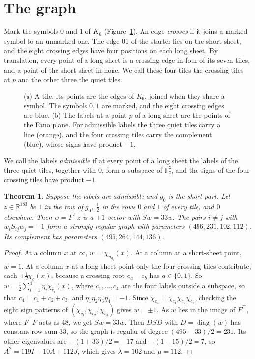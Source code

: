 \documentclass[11pt]{amsart}
\newtheorem{theorem}{Theorem}[section]
\theoremstyle{remark}
\newcommand{\F}{\mathbb{F}}
\newcommand{\R}{\mathbb{R}}
\begin{document}
\section{The graph}\label{sec:graph}

Mark the symbols $0$ and $1$ of $K_6$ (Figure~\ref{fig:tile}). An edge \emph{crosses} if it joins a marked symbol to an unmarked one. The edge $01$ of the starter lies on the short sheet, and the eight crossing edges have four positions on each long sheet. By translation, every point of a long sheet is a crossing edge in four of its seven tiles, and a point of the short sheet in none. We call these four tiles the crossing tiles at $p$ and the other three the quiet tiles.

\begin{figure}[t]
\centering

\caption{(a) A tile. Its points are the edges of $K_6$, joined when they share a symbol. The symbols $0,1$ are marked, and the eight crossing edges are blue. (b) The labels at a point $p$ of a long sheet are the points of the Fano plane. For admissible labels the three quiet tiles carry a line (orange), and the four crossing tiles carry the complement (blue), whose signs have product $-1$.}
\label{fig:tile}
\end{figure}

We call the labels \emph{admissible} if at every point of a long sheet the labels of the three quiet tiles, together with $0$, form a subspace of $\F_2^3$, and the signs of the four crossing tiles have product $-1$.

\begin{theorem}\label{thm:main}
Suppose the labels are admissible and $g_0$ is the short part. Let $z\in\R^{183}$ be $1$ in the row of $g_0$, $\tfrac12$ in the rows $0$ and $1$ of every tile, and $0$ elsewhere. Then $w=F^{\top}z$ is a $\pm1$ vector with $Sw=33w$. The pairs $i\ne j$ with $w_iS_{ij}w_j=-1$ form a strongly regular graph with parameters $(496,231,102,112)$. Its complement has parameters $(496,264,144,136)$.
\end{theorem}

\begin{proof}
At a column $x$ at $\infty$, $w=\chi_{u_{g_0}}(x)$. At a column at a short-sheet point, $w=1$. At a column $x$ at a long-sheet point only the four crossing tiles contribute, each $\pm\tfrac12\chi_c(x)$, because a crossing root $e_a-e_b$ has $a\in\{0,1\}$. So $w=\tfrac12\sum_{i=1}^4\eta_i\chi_{c_i}(x)$, where $c_1,\dots,c_4$ are the four labels outside a subspace, so that $c_4=c_1+c_2+c_3$, and $\eta_1\eta_2\eta_3\eta_4=-1$. Since $\chi_{c_4}=\chi_{c_1}\chi_{c_2}\chi_{c_3}$, checking the eight sign patterns of $(\chi_{c_1},\chi_{c_2},\chi_{c_3})$ gives $w=\pm1$. As $w$ lies in the image of $F^{\top}$, where $F^{\top}F$ acts as $48$, we get $Sw=33w$. Then $DSD$ with $D=\operatorname{diag}(w)$ has constant row sum $33$, so the graph is regular of degree $(495-33)/2=231$. Its other eigenvalues are $-(1+33)/2=-17$ and $-(1-15)/2=7$, so $A^2=119I-10A+112J$, which gives $\lambda=102$ and $\mu=112$.
\end{proof}
\end{document}
